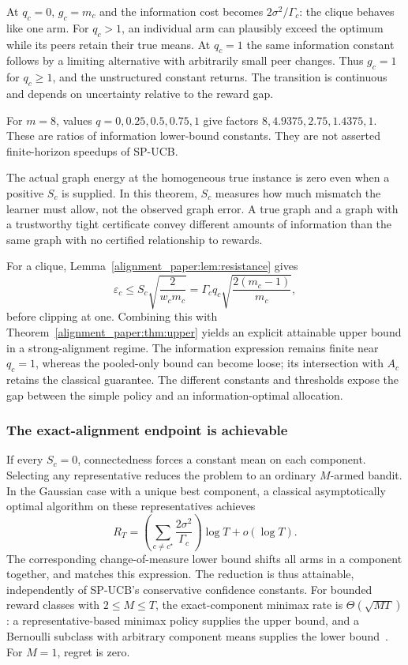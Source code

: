 At $q_c=0$, $g_c=m_c$ and the information cost becomes $2\sigma^2/\Gamma_c$: the clique behaves like one arm. For $q_c>1$, an individual arm can plausibly exceed the optimum while its peers retain their true means. At $q_c=1$ the same information constant follows by a limiting alternative with arbitrarily small peer changes. Thus $g_c=1$ for $q_c\ge1$, and the unstructured constant returns. The transition is continuous and depends on uncertainty relative to the reward gap.

For $m=8$, values $q=0,0.25,0.5,0.75,1$ give factors $8,4.9375,2.75,1.4375,1$. These are ratios of information lower-bound constants. They are not asserted finite-horizon speedups of SP-UCB.

The actual graph energy at the homogeneous true instance is zero even when a positive $S_c$ is supplied. In this theorem, $S_c$ measures how much mismatch the learner must allow, not the observed graph error. A true graph and a graph with a trustworthy tight certificate convey different amounts of information than the same graph with no certified relationship to rewards.

For a clique, Lemma~\ref{alignment_paper:lem:resistance} gives
\begin{equation}
 \varepsilon_c\le S_c\sqrt{\frac{2}{w_cm_c}}
 =\Gamma_c q_c\sqrt{\frac{2(m_c-1)}{m_c}},
 \label{alignment_paper:eq:cliquewidth}
\end{equation}
before clipping at one. Combining this with Theorem~\ref{alignment_paper:thm:upper} yields an explicit attainable upper bound in a strong-alignment regime. The information expression remains finite near $q_c=1$, whereas the pooled-only bound can become loose; its intersection with $A_c$ retains the classical guarantee. The different constants and thresholds expose the gap between the simple policy and an information-optimal allocation.



\subsubsection{The exact-alignment endpoint is achievable}
If every $S_c=0$, connectedness forces a constant mean on each component. Selecting any representative reduces the problem to an ordinary $M$-armed bandit. In the Gaussian case with a unique best component, a classical asymptotically optimal algorithm on these representatives achieves
\begin{equation}
 R_T=\left(\sum_{c\ne c^\star}\frac{2\sigma^2}{\Gamma_c}\right)\log T
      +o(\log T).
 \label{alignment_paper:eq:exact}
\end{equation}
The corresponding change-of-measure lower bound shifts all arms in a component together, and matches this expression. The reduction is thus attainable, independently of SP-UCB's conservative confidence constants. For bounded reward classes with $2\le M\le T$, the exact-component minimax rate is $\Theta(\sqrt{MT})$: a representative-based minimax policy supplies the upper bound, and a Bernoulli subclass with arbitrary component means supplies the lower bound~\cite{collected20,collected22}. For $M=1$, regret is zero.

